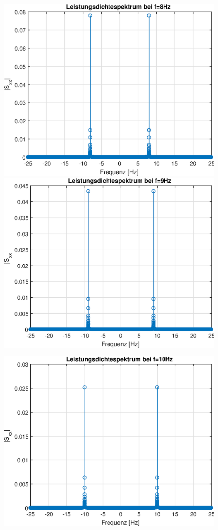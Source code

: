 \documentclass{article}
\begin{document}
\begin{figure}[!h]
\includegraphics[width=0.5\linewidth]{img/sim_lds_sine_freq_8}
\includegraphics[width=0.5\linewidth]{img/sim_lds_sine_freq_9}
\end{figure}
\begin{figure}[!h]
\centering
\includegraphics[width=0.5\linewidth]{img/sim_lds_sine_freq_10}
\end{figure}
\end{document}
